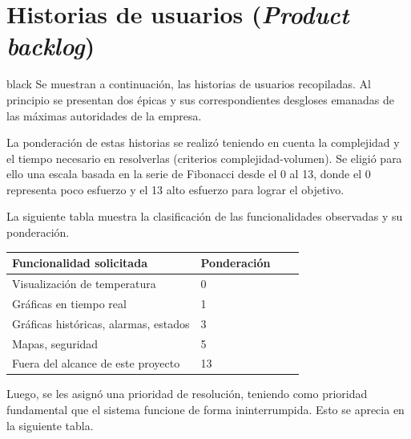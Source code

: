 \documentclass[11pt]{charter}
\begin{document}
\section{Historias de usuarios (\textit{Product backlog})}
\label{sec:backlog}

\begin{consigna}{black}
Se muestran a continuación, las historias de usuarios recopiladas. Al principio se presentan dos épicas y sus correspondientes desgloses emanadas de las máximas autoridades de la empresa.

La ponderación de estas historias se realizó teniendo en cuenta la complejidad y el tiempo necesario en resolverlas (criterios complejidad-volumen). Se eligió para ello una escala basada en la serie de Fibonacci desde el 0 al 13, donde el 0 representa poco esfuerzo y el 13 alto esfuerzo para lograr el objetivo. 

La siguiente tabla muestra la clasificación de las funcionalidades observadas y su ponderación.


\begin{table}[ht]
\begin{tabularx}{\linewidth}{@{}|l|X|X|l|@{}}
\hline
\rowcolor[HTML]{C0C0C0} 
Funcionalidad solicitada           & Ponderación 	\\ \hline

Visualización de temperatura & 0\\ \hline
Gráficas en tiempo real & 1\\ \hline
Gráficas históricas, alarmas, estados & 3\\ \hline
Mapas, seguridad & 5\\ \hline
Fuera del alcance de este proyecto & 13\\ \hline

\end{tabularx}
\end{table}
Luego, se les asignó una prioridad de resolución, teniendo como prioridad fundamental que el sistema funcione de forma ininterrumpida. Esto se aprecia en la siguiente tabla.


\end{consigna}
\end{document}
